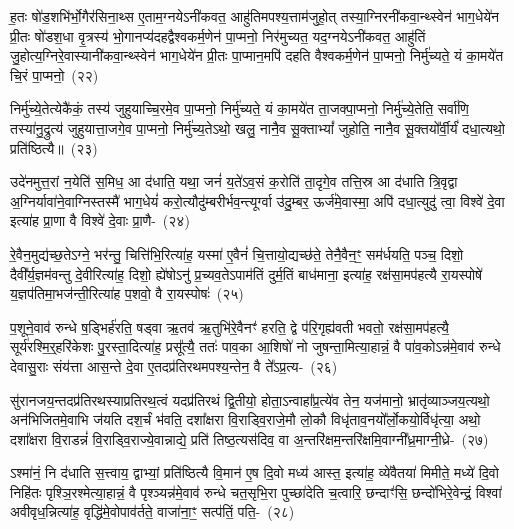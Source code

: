 ह॒तः षो॑ड॒शभि॑र्भो॒गैर॑सिना॒थ्स ए॒ताम॒ग्नये\-ऽनी॑कवत॒ आहु॑तिमपश्य॒त्ताम॑जुहो॒त् तस्या॒ग्नि\-रनी॑कवा॒न्थ्स्वेन॑ भाग॒\-धेये॑न प्री॒तः षो॑डश॒धा वृ॒त्रस्य॑ भो॒गानप्य॑दहद्वैश्वकर्म॒णेन॑ पा॒प्मनो॒ निर॑मुच्यत॒ यद॒ग्नये\-ऽनी॑कवत॒ आहु॑तिं जु॒होत्य॒ग्निरे॒वास्यानी॑कवा॒न्थ्स्वेन॑ भाग॒\-धेये॑न प्री॒तः पा॒प्मान॒मपि॑ दहति वैश्वकर्म॒णेन॑ पा॒प्मनो॒ निर्मु॑च्यते॒ यं का॒मये॑त चि॒रं पा॒प्मनो॒~(२२)\ip

निर्मु॑च्ये॒तेत्येकै॑कं॒ तस्य॑ जुहुयाच्चि॒रमे॒व पा॒प्मनो॒ निर्मु॑च्यते॒ यं का॒मये॑त ता॒जक्पा॒प्मनो॒ निर्मु॑च्ये॒तेति॒ सर्वा॑णि॒ तस्या॑नु॒द्रुत्य॑ जुहुयात्ता॒जगे॒व पा॒प्मनो॒ निर्मु॑च्य॒ते\-ऽथो॒ खलु॒ नानै॒व सू॒क्ता\-भ्यां᳚ जुहोति॒ नानै॒व सू॒क्तयो᳚र्वी॒र्यं॑ दधा॒त्यथो॒ प्रति॑ष्ठित्यै॥~(२३)\ip

{\anuvakamend[{दे॒वाः प्रा॑जाप॒त्यो वृ॒त्रश्चि॒रं पा॒प्मन॑श्चत्वारि॒ꣳ॒शच्च॑}]}

उदे॑नमुत्त॒रां न॒येति॑ स॒मिध॒ आ द॑धाति॒ यथा॒ जनं॑ य॒ते॑\-ऽव॒सं क॒रोति॑ ता॒दृगे॒व तत्ति॒स्र आ द॑धाति त्रि॒वृद्वा अ॒ग्निर्यावा॑ने॒वाग्निस्तस्मै॑ भाग॒\-धेयं॑ करो॒त्यौदु॑म्बरीर्भव॒न्त्यूर्ग्वा उ॑दु॒म्बर॒ ऊर्ज॑मे॒वास्मा॒ अपि॑ दधा॒त्युदु॑ त्वा॒ विश्वे॑ दे॒वा इत्या॑ह प्रा॒णा वै विश्वे॑ दे॒वाः प्रा॒णै-~(२४)\ip

रे॒वैन॒मुद्य॑च्छ॒ते\-ऽग्ने॒ भर॑न्तु॒ चित्ति॑भि॒रित्या॑ह॒ यस्मा॑ ए॒वैनं॑ चि॒त्तायो॒द्यच्छ॑ते॒ तेनै॒वैन॒ꣳ॒ सम॑र्धयति॒ पञ्च॒ दिशो॒ दैवी᳚र्य॒ज्ञम॑वन्तु दे॒वीरित्या॑ह॒ दिशो॒ ह्ये॑षो\-ऽनु॑ प्र॒च्यव॒ते\-ऽपाम॑तिं दुर्म॒तिं बाध॑माना॒ इत्या॑ह॒ रक्ष॑सा॒मप॑हत्यै रा॒यस्पोषे॑ य॒ज्ञप॑तिमा॒भज॑न्ती॒रित्या॑ह प॒शवो॒ वै रा॒यस्पोषः॑~(२५)\ip

प॒शूने॒वाव॑ रुन्धे ष॒ड्भिर्\mbox{}ह॑रति॒ षड्वा ऋ॒तव॑ ऋ॒तुभि॑रे॒वैनꣳ॑ हरति॒ द्वे प॑रि॒गृह्य॑वती भवतो॒ रक्ष॑सा॒मप॑हत्यै॒ सूर्य॑रश्मि॒र्॒\mbox{}हरि॑केशः पु॒रस्ता॒दित्या॑ह॒ प्रसू᳚त्यै॒ ततः॑ पाव॒का आ॒शिषो॑ नो जुषन्ता॒मित्या॒हान्नं॒ वै पा॑व॒को\-ऽन्न॑मे॒वाव॑ रुन्धे देवासु॒राः संय॑त्ता आस॒न्ते दे॒वा ए॒तदप्र॑तिरथमपश्य॒न्तेन॒ वै ते᳚\-ऽप्र॒त्य-~(२६)\ip

सु॑रानजय॒न्तदप्र॑तिरथस्याप्रतिरथ॒त्वं यदप्र॑तिरथं द्वि॒तीयो॒ होता॒\-ऽन्वाहा᳚प्र॒त्ये॑व तेन॒ यज॑मानो॒ भ्रातृ॑व्याञ्जय॒त्यथो॒ अन॑भिजितमे॒वाभि ज॑यति दश॒र्चं भ॑वति॒ दशा᳚क्षरा वि॒राड्वि॒राजे॒मौ लो॒कौ विधृ॑ताव॒नयो᳚र्लो॒कयो॒र्विधृ॑त्या॒ अथो॒ दशा᳚क्षरा वि॒राडन्नं॑ वि॒राड्वि॒राज्ये॒वान्नाद्ये॒ प्रति॑ तिष्ठ॒त्यस॑दिव॒ वा अ॒न्तरि॑क्षम॒न्तरि॑क्षमि॒वाग्नी᳚ध्र॒माग्नी॒ध्रे-~(२७)\ip

ऽश्मा॑नं॒ नि द॑धाति स॒त्त्वाय॒ द्वाभ्यां॒ प्रति॑ष्ठित्यै वि॒मान॑ ए॒ष दि॒वो मध्य॑ आस्त॒ इत्या॑ह॒ व्ये॑वैतया॑ मिमीते॒ मध्ये॑ दि॒वो निहि॑तः पृश्ञि॒रश्मेत्या॒हान्नं॒ वै पृश्ञ्यन्न॑मे॒वाव॑ रुन्धे चत॒सृभि॒रा पुच्छा॑देति च॒त्वारि॒ छन्दाꣳ॑सि॒ छन्दो॑भिरे॒वेन्द्रं॒ विश्वा॑ अवीवृध॒न्नित्या॑ह॒ वृद्धि॑मे॒वोपाव॑र्तते॒ वाजा॑ना॒ꣳ॒ सत्प॑तिं॒ पति॒-~(२८)\ip

